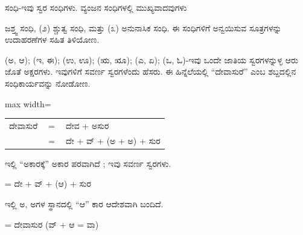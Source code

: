 \kbvcontinued ಸಂಧಿ-ಇವು ಸ್ವರ ಸಂಧಿಗಳು. ವ್ಯಂಜನ ಸಂಧಿಗಳಲ್ಲಿ ಮುಖ್ಯವಾದವುಗಳು\par

\vspace{2.5pt plus 3pt minus 0.5pt}\noindent\hspace*{1.2em}\hspace{0.55em}ಜಶ್ತ್ವ ಸಂಧಿ, (೨) ಶ್ಚುತ್ವ ಸಂಧಿ, ಮತ್ತು (೩) ಅನುನಾಸಿಕ ಸಂಧಿ. ಈ ಸಂಧಿಗಳಿಗೆ ಅನ್ವಯಿಸುವ ಸೂತ್ರಗಳನ್ನು ಉದಾಹರಣೆಗಳ ಸಹಿತ ತಿಳಿಯೋಣ.\par


\vspace{4pt plus 4pt minus 1pt}\hspace{0.5em}(ಅ, ಆ); (ಇ, ಈ); (ಉ, ಊ); (ಋ, ೠ); (ಎ, ಏ); (ಒ, ಓ)-ಇವು ಒಂದೇ ಜಾತಿಯ ಸ್ವರಗಳನ್ನುಳ್ಳ ಆರು ಜೊತೆ ಅಕ್ಷರಗಳು. ಇವುಗಳಿಗೆ ಸವರ್ಣ ಸ್ವರಗಳೆಂದು ಹೆಸರು. ಈ ಹಿನ್ನೆಲೆಯಲ್ಲಿ “ದೇವಾಸುರೆ” ಎಂಬ ಶಬ್ದದಲ್ಲಿನ ಸಂಧಿಕಾರ್ಯವನ್ನು ನೋಡೋಣ.\par

\begin{kbvderiv}
\vspace{4pt plus 3pt minus 1pt}
\begin{center}\begin{adjustbox}{max width=\textwidth}
{\renewcommand{\arraystretch}{1.22}\setlength{\tabcolsep}{4pt}
\begin{tabular}{l c l}
ದೇವಾಸುರೆ & {\color{kbvgrey}$=$} & ದೇವ + ಅಸುರ \\
 & {\color{kbvgrey}$=$} & ದೇ + ವ್‌ + (ಅ + ಅ) + ಸುರ \\
\end{tabular}}
\end{adjustbox}\end{center}
\vspace{4pt plus 3pt minus 1pt}
\end{kbvderiv}

\indent ಇಲ್ಲಿ “ಅಕಾರಕ್ಕೆ” ಅಕಾರ ಪರವಾಗಿದೆ ; ಇವು ಸವರ್ಣ ಸ್ವರಗಳು.\par

\indent  = ದೇ + ವ್‌ + (ಆ) + ಸುರ\par

\indent ಇಲ್ಲಿ ಅ, ಅಗಳ ಸ್ಥಾನದಲ್ಲಿ “ಆ” ಕಾರ ಆದೇಶವಾಗಿ ಬಂದಿದೆ.\par

\indent  = ದೇವಾಸುರ (ವ್‌ + ಆ = ವಾ)\par

